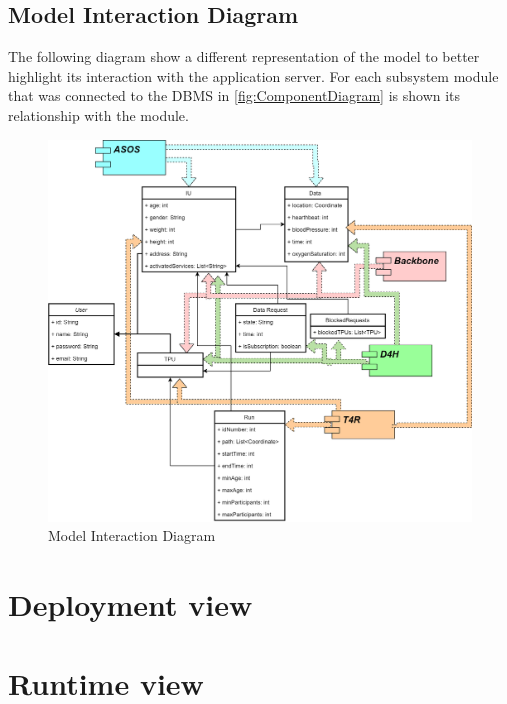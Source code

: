 \subsection{Model Interaction Diagram}
The following diagram show a different representation of the model to better highlight its interaction with the application server. For each subsystem module that was connected to the DBMS in \ref{fig:ComponentDiagram} is shown its relationship with the module. 
\begin{figure}[H]
\caption{Model Interaction Diagram}
\label{fig:ModelInteractionDiagram}
\centering
\includegraphics[width = \textwidth]{sections/architecturalDesign/modelInteractionDiagram.png}
\end{figure}
\clearpage
\section{Deployment view}
\section{Runtime view}
